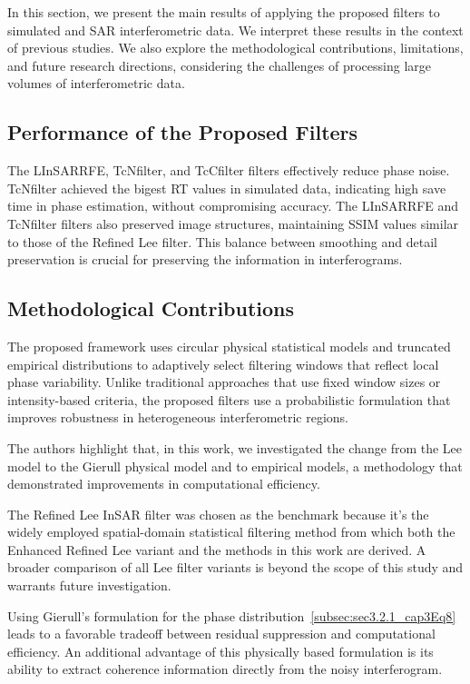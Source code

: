 \documentclass[remotesensing,article,submit,pdftex,moreauthors]{Definitions/mdpi}
\begin{document}
In this section, we present the main results of applying the proposed filters to simulated and SAR interferometric data. 
We interpret these results in the context of previous studies. 
We also explore the methodological contributions, limitations, and future research directions, considering the challenges of processing large volumes of interferometric data.

\subsection{Performance of the Proposed Filters}

The LInSARRFE, TcNfilter, and TcCfilter filters effectively reduce phase noise. 
TcNfilter achieved the bigest RT values in simulated data, indicating high save time in phase estimation, without compromising accuracy. 
The LInSARRFE and TcNfilter filters also preserved image structures, maintaining SSIM values similar to those of the Refined Lee filter. 
This balance between smoothing and detail preservation is crucial for preserving the information in interferograms.

\subsection{Methodological Contributions}

The proposed framework uses circular physical statistical models and truncated empirical distributions to adaptively select filtering windows that reflect local phase variability. Unlike traditional approaches that use fixed window sizes or intensity-based criteria, the proposed filters use a probabilistic formulation that improves robustness in heterogeneous interferometric regions.

The authors highlight that, in this work, we investigated the change from the Lee model to the Gierull physical model and to empirical models, a methodology that demonstrated improvements in computational efficiency.


The Refined Lee InSAR filter was chosen as the benchmark because it’s the widely employed spatial-domain statistical filtering method from which both the Enhanced Refined Lee variant and the methods in this work are derived. A broader comparison of all Lee filter variants is beyond the scope of this study and warrants future investigation.


Using Gierull's formulation for the phase distribution~\eqref{subsec:sec3.2.1_cap3Eq8} leads to a favorable tradeoff between residual suppression and computational efficiency. 
An additional advantage of this physically based formulation is its ability to extract coherence information directly from the noisy interferogram. 
\end{document}
